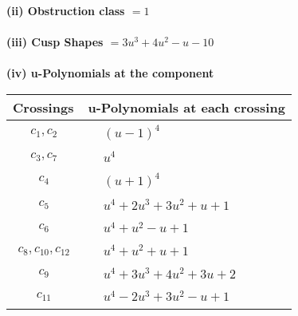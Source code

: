 \documentclass[1p]{elsarticle_modified}
\theoremstyle{definition}
\begin{document}
\flushleft \textbf{(ii) Obstruction class $= 1$}\\~\\
\flushleft \textbf{(iii) Cusp Shapes $= 3 u^3+4 u^2- u-10$}\\~\\
\newpage\renewcommand{\arraystretch}{1}
\flushleft \textbf{(iv) u-Polynomials at the component}\newline \\
\begin{tabular}{m{50pt}|m{274pt}}
Crossings & \hspace{64pt}u-Polynomials at each crossing \\
\hline $$\begin{aligned}c_{1},c_{2}\end{aligned}$$&$\begin{aligned}
&(u-1)^4
\end{aligned}$\\
\hline $$\begin{aligned}c_{3},c_{7}\end{aligned}$$&$\begin{aligned}
&u^4
\end{aligned}$\\
\hline $$\begin{aligned}c_{4}\end{aligned}$$&$\begin{aligned}
&(u+1)^4
\end{aligned}$\\
\hline $$\begin{aligned}c_{5}\end{aligned}$$&$\begin{aligned}
&u^4+2 u^3+3 u^2+u+1
\end{aligned}$\\
\hline $$\begin{aligned}c_{6}\end{aligned}$$&$\begin{aligned}
&u^4+u^2- u+1
\end{aligned}$\\
\hline $$\begin{aligned}c_{8},c_{10},c_{12}\end{aligned}$$&$\begin{aligned}
&u^4+u^2+u+1
\end{aligned}$\\
\hline $$\begin{aligned}c_{9}\end{aligned}$$&$\begin{aligned}
&u^4+3 u^3+4 u^2+3 u+2
\end{aligned}$\\
\hline $$\begin{aligned}c_{11}\end{aligned}$$&$\begin{aligned}
&u^4-2 u^3+3 u^2- u+1
\end{aligned}$\\
\hline
\end{tabular}\\~\\
\end{document}

